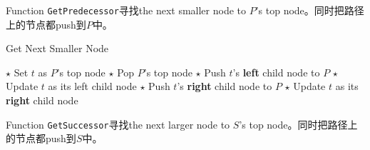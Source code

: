 Function \texttt{GetPredecessor}寻找the next smaller node to $P$'s top node。同时把路径上的节点都push到$P$中。
\begin{algorithm}[H]
\caption{Get Next Smaller Node}
\begin{algorithmic}[1]
\State $\star$ Set $t$ as $P$'s top node
\State $\star$ Pop $P$'s top node
\State $\star$ Push $t$'s \textbf{left} child node to $P$
\State $\star$ Update $t$ as its left child node
\State $\star$ Push $t$'s \textbf{right} child node to $P$
\State $\star$ Update $t$ as its \textbf{right} child node
\EndWhile
\EndIf
\EndProcedure
\end{algorithmic}
\end{algorithm}
Function \texttt{GetSuccessor}寻找the next larger node to $S$'s top node。同时把路径上的节点都push到$S$中。


